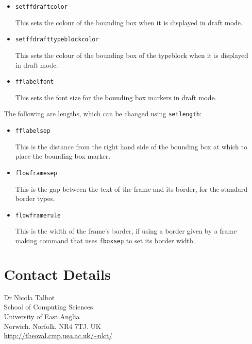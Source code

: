 \documentclass[a4paper,twoside]{book}
\newcommand{\cmdname}[1]{\texttt{\symbol{92}#1}}
\begin{document}
\begin{itemize}
\item \cmdname{setffdraftcolor}

This sets the colour of the bounding box
when it is displayed in draft mode.

\item
\cmdname{setffdrafttypeblockcolor}

This sets the colour of
the bounding box of the typeblock when it is displayed
in draft mode.

\item \cmdname{fflabelfont}

This sets the font size for the bounding box markers in
draft mode.

\end{itemize}

The following are lengths, which can be changed using
\cmdname{setlength}:

\begin{itemize}
\item \cmdname{fflabelsep}

This is the distance from the right hand side of the
bounding box at which to place the bounding box marker.

\item \cmdname{flowframesep}

This is the gap between the text of the frame and
its border, for the standard border types.

\item \cmdname{flowframerule}

This is the width of the frame's border, if using
a border given by a frame making command that uses \cmdname{fboxsep}
to set its border width.
\end{itemize}

\chapter*{Contact Details}
\disablethumbtabs

Dr Nicola Talbot\\
School of Computing Sciences\\
University of East Anglia\\
Norwich. Norfolk. NR4 7TJ. UK\\
\url{http://theoval.cmp.uea.ac.uk/~nlct/}

\finishthispage\mbox{}
\end{document}
